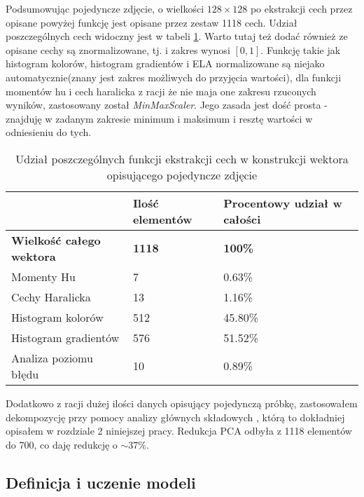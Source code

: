 Podsumowując pojedyncze zdjęcie, o wielkości $128 \times 128$ po ekstrakcji cech przez opisane powyżej funkcję jest opisane przez zestaw 1118 cech. Udział poszczególnych cech widoczny jest w tabeli \ref{tab:pdst}.  Warto tutaj też dodać również ze opisane cechy są znormalizowane, tj. i zakres wynosi $\left [ 0,1 \right ]$. Funkcję takie jak histogram kolorów, histogram gradientów i ELA normalizowane są niejako automatycznie(znany jest zakres możliwych do przyjęcia wartości), dla funkcji momentów hu i cech haralicka z racji że nie maja one zakresu rzuconych wyników, zastosowany został \textit{MinMaxScaler}. Jego zasada jest dość prosta - znajduję w zadanym zakresie minimum i maksimum i resztę wartości w odniesieniu do tych.  \\

\begin{table}[]
	\centering
	\begin{tabular}{l|l|l|}
		\cline{2-3}
		& Ilość elementów & Procentowy udział w całości \\ \hline
		\multicolumn{1}{|l|}{\textbf{Wielkość całego wektora}} & \textbf{1118} & \textbf{100\%} \\ \hline
		\multicolumn{1}{|l|}{Momenty Hu}            & 7               & 0.63\%                      \\ \hline
		\multicolumn{1}{|l|}{Cechy Haralicka}       & 13              & 1.16\%                      \\ \hline
		\multicolumn{1}{|l|}{Histogram kolorów}     & 512             & 45.80\%                     \\ \hline
		\multicolumn{1}{|l|}{Histogram gradientów}  & 576             & 51.52\%                     \\ \hline
		\multicolumn{1}{|l|}{Analiza poziomu błędu} & 10              & 0.89\%                      \\ \hline
	\end{tabular}
	\caption{Udział poszczególnych funkcji ekstrakcji cech w konstrukcji wektora opisującego pojedyncze zdjęcie}
	\label{tab:pdst}
\end{table}

Dodatkowo z racji dużej ilości danych opisujący pojedynczą próbkę, zastosowałem dekompozycję przy pomocy analizy głównych składowych \cite{pca}, którą to dokładniej opisałem w rozdziale 2 niniejszej pracy.  Redukcja PCA odbyła z 1118 elementów do 700, co daję redukcję o $\sim37\%$.

\subsection{Definicja i uczenie modeli}

